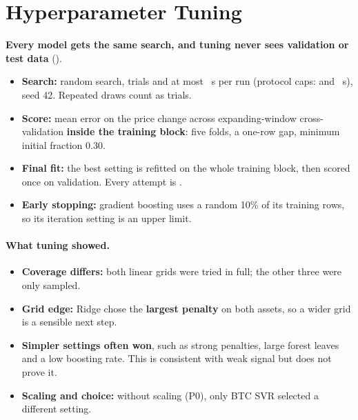 \section{Hyperparameter Tuning}
\label{sec:tuning}

\textbf{Every model gets the same search, and tuning never sees validation or test
data} ().

\begin{itemize}
  \item \textbf{Search:} random search, \TrialsUsed{} trials and at most
  \SecondsUsed{}~s per run (protocol caps: \TrialsMax{} and \SecondsMax{}~s), seed
  42. Repeated draws count as trials.
  \item \textbf{Score:} mean error on the price change across expanding-window
  cross-validation \textbf{inside the training block}: five folds, a one-row gap,
  minimum initial fraction 0.30.
  \item \textbf{Final fit:} the best setting is refitted on the whole training
  block, then scored once on validation. Every attempt is
  .
  \item \textbf{Early stopping:} gradient boosting uses a random 10\% of its
  training rows, so its iteration setting is an upper limit.
\end{itemize}



\paragraph{What tuning showed.}
\begin{itemize}
  \item \textbf{Coverage differs:} both linear grids were tried in full; the other
  three were only sampled.
  \item \textbf{Grid edge:} Ridge chose the \textbf{largest penalty} on both assets,
  so a wider grid is a sensible next step.
  \item \textbf{Simpler settings often won}, such as strong penalties, large forest
  leaves and a low boosting rate. This is consistent with weak signal but does not
  prove it.
  \item \textbf{Scaling and choice:} without scaling (P0), only BTC SVR selected a
  different setting.
\end{itemize}
